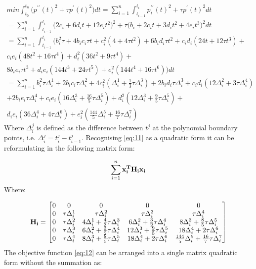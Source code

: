 \documentclass{article}
\begin{document}
\begin{eqnarray}
    \label{eq:11}
    \nonumber
    min \int_{t_0}^{t_n} \bigl( p^{\prime\prime}(t)^2 + \tau p^{\prime}(t)^2 \bigr) dt 
    = \sum_{i=1}^{n}\int_{t_{i - 1}}^{t_i}p^{\prime\prime}_i(t)^2 + \tau p^{\prime}(t)^2 dt \\
    \nonumber
    =\sum_{i=1}^{n}\int_{t_{i - 1}}^{t_i} \bigl( 2 c_i + 6 d_i t + 12 e_i t^2\bigr)^2 
    + \tau \bigl( b_i + 2 c_i t + 3 d_i t^2 + 4 e_i t^3 \bigr)^2 dt \\
    \nonumber
    =\sum_{i=1}^{n}\int_{t_{i - 1}}^{t_i} \biggl( b_i^2\tau + 4 b_i c_i \tau t + c_i^2(4 + 4 \tau t^2) 
    + 6 b_i d_i \tau t^2 + c_i d_i (24 t + 12 \tau t^3) + \\
    \nonumber
    c_i e_i (48 t^2 + 16 \tau t^4) + d_i^2 (36 t^2 + 9 \tau t^4) + \\
    \nonumber
    8 b_i e_i \tau t^3 + d_i e_i (144 t^3 + 24 \tau t^5) + 
     e_i^2 (144 t^4 + 16 \tau t^6) \biggr) dt \\
    \nonumber
    =\sum_{i=1}^{n} b_i^2 \tau \Delta_i^1 + 2 b_i c_i \tau \Delta_i^2  + 4 c_i^2 (\Delta_i^1 + \frac{1}{3} \tau \Delta_i^3  ) 
    + 2 b_i d_i \tau \Delta_i^3 + c_i d_i (12 \Delta_i^2 + 3 \tau \Delta_i^4 ) \\
    \nonumber
    + 2 b_i e_i \tau \Delta_i^4 + c_i e_i ( 16 \Delta_i^3 + \frac{16}{5} \tau \Delta_i^5 ) + d_i^2 (12 \Delta_i^3 + 
    \frac{9}{5} \tau \Delta_i^5 ) + \\
    d_i e_i ( 36 \Delta_i^4 + 4 \tau \Delta_i^6 ) + 
    e_i^2 ( \frac{144}{5} \Delta_i^5 + \frac{16}{7} \tau \Delta_i^7 )
\end{eqnarray}
Where $\Delta_i^j$ is defined as the difference between $t^j$ at the polynomial boundary points, 
i.e. $\Delta_i^j = t_i^j - t_{i-1}^j$.
Recognising \ref{eq:11} as a quadratic form it can be reformulating in the following matrix form:


\begin{equation}
    \label{eq:12}
    \sum_{i=1}^{n}\mathbf{x_i^TH_ix_i}
\end{equation}
Where:

\begin{equation*}
    \mathbf{H_i} = \begin{bmatrix}
        0 & 0 & 0 & 0 & 0 \\
        0 & \tau \Delta_i^1 & \tau \Delta_i^2 & \tau \Delta_i^3 & \tau \Delta_i^4 \\
        0 & \tau \Delta_i^2 & 4 \Delta_i^1 + \frac{4}{3} \tau \Delta_i^3 & 6 \Delta_i^2 + \frac{3}{2} \tau \Delta_i^4 & 8 \Delta_i^3 + \frac{8}{5} \tau \Delta_i^5 \\
        0 & \tau \Delta_i^3 & 6 \Delta_i^2 + \frac{3}{2} \tau \Delta_i^4 & 12 \Delta_i^3 + \frac{9}{5} \tau \Delta_i^5 & 18 \Delta_i^4 + 2 \tau \Delta_i^6 \\
        0 & \tau \Delta_i^4 & 8 \Delta_i^3 + \frac{8}{5} \tau \Delta_i^5 & 18 \Delta_i^4 + 2 \tau \Delta_i^6 & \frac{144}{5} \Delta_i^5 + \frac{16}{7} \tau \Delta_i^7
    \end{bmatrix}
\end{equation*}
The objective function \ref{eq:12} can be arranged into a single matrix quadratic form without
the summation as:
\end{document}

